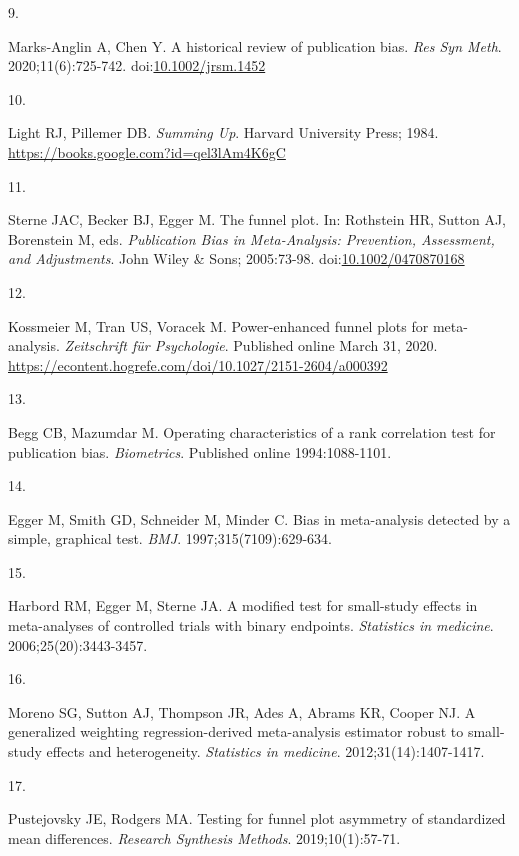 \documentclass[
  american,
  man, donotrepeattitle,floatsintext]{apa7}
\newlength{\cslhangindent}
\newlength{\csllabelwidth}
\newenvironment{CSLReferences}[2] %
 {\begin{list}{}{%
  \setlength{\itemindent}{0pt}
  \setlength{\leftmargin}{0pt}
  \setlength{\parsep}{0pt}
  \ifodd #1
   \setlength{\leftmargin}{\cslhangindent}
   \setlength{\itemindent}{-1\cslhangindent}
  \fi
  \setlength{\itemsep}{#2\baselineskip}}}
 {\end{list}}
\newcommand{\CSLLeftMargin}[1]{\parbox[t]{\csllabelwidth}{\strut#1\strut}}
\newcommand{\CSLRightInline}[1]{\parbox[t]{\linewidth - \csllabelwidth}{\strut#1\strut}}
\begin{document}
\begin{CSLReferences}{0}{1}
\CSLLeftMargin{9. }%
\CSLRightInline{Marks‐Anglin A, Chen Y. A historical review of publication bias. \emph{Res Syn Meth}. 2020;11(6):725-742. doi:\href{https://doi.org/10.1002/jrsm.1452}{10.1002/jrsm.1452}}

\CSLLeftMargin{10. }%
\CSLRightInline{Light RJ, Pillemer DB. \emph{Summing {Up}}. {Harvard University Press}; 1984. \url{https://books.google.com?id=qel3lAm4K6gC}}

\CSLLeftMargin{11. }%
\CSLRightInline{Sterne JAC, Becker BJ, Egger M. The funnel plot. In: Rothstein HR, Sutton AJ, Borenstein M, eds. \emph{Publication {Bias} in {Meta-Analysis}: {Prevention}, {Assessment}, and {Adjustments}}. {John Wiley \& Sons}; 2005:73-98. doi:\href{https://doi.org/10.1002/0470870168}{10.1002/0470870168}}

\CSLLeftMargin{12. }%
\CSLRightInline{Kossmeier M, Tran US, Voracek M. Power-enhanced funnel plots for meta-analysis. \emph{Zeitschrift für Psychologie}. Published online March 31, 2020. \url{https://econtent.hogrefe.com/doi/10.1027/2151-2604/a000392}}

\CSLLeftMargin{13. }%
\CSLRightInline{Begg CB, Mazumdar M. Operating characteristics of a rank correlation test for publication bias. \emph{Biometrics}. Published online 1994:1088-1101.}

\CSLLeftMargin{14. }%
\CSLRightInline{Egger M, Smith GD, Schneider M, Minder C. Bias in meta-analysis detected by a simple, graphical test. \emph{BMJ}. 1997;315(7109):629-634.}

\CSLLeftMargin{15. }%
\CSLRightInline{Harbord RM, Egger M, Sterne JA. A modified test for small-study effects in meta-analyses of controlled trials with binary endpoints. \emph{Statistics in medicine}. 2006;25(20):3443-3457.}

\CSLLeftMargin{16. }%
\CSLRightInline{Moreno SG, Sutton AJ, Thompson JR, Ades A, Abrams KR, Cooper NJ. A generalized weighting regression-derived meta-analysis estimator robust to small-study effects and heterogeneity. \emph{Statistics in medicine}. 2012;31(14):1407-1417.}

\CSLLeftMargin{17. }%
\CSLRightInline{Pustejovsky JE, Rodgers MA. Testing for funnel plot asymmetry of standardized mean differences. \emph{Research Synthesis Methods}. 2019;10(1):57-71.}


\end{CSLReferences}
\end{document}
